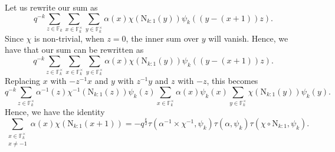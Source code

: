 \documentclass[12pt, reqno]{amsart}
\theoremstyle{definition}
\theoremstyle{definition}
\theoremstyle{definition}
\newcommand{\multiplicativegroup}[1]{#1^{\times}}
\newcommand{\fieldCharacter}{\psi}
\newcommand{\FieldNorm}[2]{\mathrm{N}_{#1:#2}}
\newcommand{\finiteField}{\mathbb{F}}
\newcommand{\finiteFieldExtension}[1]{\finiteField_{#1}}
\newcommand{\GaussSumCharacter}[3]{\tau\left(#1 \times #2, #3\right)}
\begin{document}
Let us rewrite our sum as
$$q^{-k} \sum_{z \in \finiteFieldExtension{k}} \sum_{x \in  \multiplicativegroup{\finiteFieldExtension{k}}} \sum_{y \in \multiplicativegroup{\finiteFieldExtension{k}}}\alpha\left(x\right) \chi\left(\FieldNorm{k}{1}\left(y\right)\right) \fieldCharacter_k\left(\left(y - \left(x + 1\right)\right)z\right).$$
Since $\chi$ is non-trivial, when $z = 0$, the inner sum over $y$ will vanish. Hence, we have that our sum can be rewritten as
$$q^{-k} \sum_{z \in \multiplicativegroup{\finiteFieldExtension{k}}} \sum_{x \in  \multiplicativegroup{\finiteFieldExtension{k}}} \sum_{y \in \multiplicativegroup{\finiteFieldExtension{k}}}\alpha\left(x\right) \chi\left(\FieldNorm{k}{1}\left(y\right)\right) \fieldCharacter_k\left(\left(y - \left(x + 1\right)\right)z\right).$$
Replacing $x$ with $-z^{-1} x$ and $y$ with $z^{-1} y$ and $z$ with $-z$, this becomes
$$q^{-k} \sum_{z \in \multiplicativegroup{\finiteFieldExtension{k}}} \alpha^{-1}\left(z\right) \chi^{-1}\left(\FieldNorm{k}{1}\left(z\right)\right) \fieldCharacter_k\left(z\right) \sum_{x \in  \multiplicativegroup{\finiteFieldExtension{k}}} \alpha\left(x\right) \fieldCharacter_k\left(x\right) \sum_{y \in \multiplicativegroup{\finiteFieldExtension{k}}} \chi\left(\FieldNorm{k}{1}\left(y\right)\right) \fieldCharacter_k\left(y\right).$$
Hence, we have the identity
$$\sum_{\substack{x \in \multiplicativegroup{\finiteFieldExtension{k}}\\
x \ne -1}} \alpha\left(x\right) \chi\left(\FieldNorm{k}{1}\left(x+1\right)\right) = -q^{\frac{k}{2}} \GaussSumCharacter{\alpha^{-1}}{\chi^{-1}}{\fieldCharacter_k} \tau\left(\alpha, \fieldCharacter_k\right) \tau\left(\chi \circ \FieldNorm{k}{1}, \fieldCharacter_k\right).$$
\end{document}
